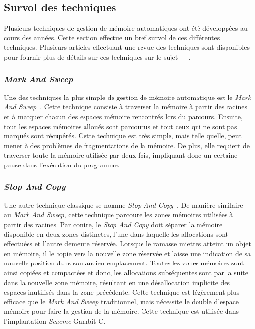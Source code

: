 \documentclass[12pt,twoside,letterpaper,francais]{book}
\newcommand{\Schemelang}{{\textit{Scheme }}}
\begin{document}
\FloatBarrier
\subsection{Survol des techniques}
Plusieurs techniques de gestion de mémoire automatiques ont été
développées au cours des années. Cette section effectue un bref survol
de ces différentes techniques. Plusieurs articles effectuant une revue
des techniques sont disponibles pour fournir plus de détails sur ces
techniques sur le
sujet~\cite{GC_REVIEW1}~\cite{GC_REVIEW2}~\cite{GC_REVIEW3}. 


\FloatBarrier
\subsubsection{\textit{Mark And Sweep}}
Une des techniques la plus simple de gestion de mémoire automatique
est le \textit{Mark And Sweep}~\cite{LISP_ORIGINS}. Cette technique
consiste à traverser la mémoire à partir des racines et à marquer
chacun des espaces mémoire rencontrés lors du parcours. Ensuite, tout
les espaces mémoires alloués sont parcourus et tout ceux qui ne sont
pas marqués sont récupérés. Cette technique est très simple, mais
telle quelle, peut mener à des problèmes de fragmentations de la
mémoire. De plus, elle requiert de traverser toute la mémoire utilisée
par deux fois, impliquant donc un certaine pause dans l'exécution du
programme.


\FloatBarrier
\subsubsection{\textit{Stop And Copy}}
Une autre technique classique se nomme \textit{Stop And
  Copy}~\cite{STOP_AND_COPY}. De manière similaire au \textit{Mark And
  Sweep}, cette technique parcoure les zones mémoires utilisées à
partir des racines. Par contre, le \textit{Stop And Copy} doit séparer
la mémoire disponible en deux zones distinctes, l'une dans laquelle
les allocations sont effectuées et l'autre demeure réservée. Lorsque
le ramasse miettes atteint un objet en mémoire, il le copie vers la
nouvelle zone réservée et laisse une indication de sa nouvelle
position dans son ancien emplacement. Toutes les zones mémoires sont
ainsi copiées et compactées et donc, les allocations subséquentes sont
par la suite dans la nouvelle zone mémoire, résultant en une
désallocation implicite des espaces inutilisés dans la zone
précédente. Cette technique est légèrement plus efficace que le
\textit{Mark And Sweep} traditionnel, mais nécessite le double
d'espace mémoire pour faire la gestion de la mémoire. Cette technique
est utilisée dans l'implantation \Schemelang Gambit-C.
\end{document}
